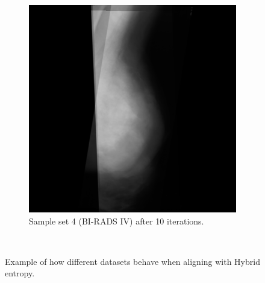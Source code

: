 \begin{figure}[H]
\begin{subfigure}[t]{0.4\textwidth}
        \includegraphics[width=\textwidth]{Appendix5/sample4/hybrid/hybrid_10.png}
        \caption{Sample set 4 (BI-RADS IV) after 10 iterations.}
        \label{fig:hybrid-set4-10iters}
    \end{subfigure}
    ~ %
      \caption{Example of how different datasets behave when aligning with Hybrid entropy.}
      \label{fig:hybrid-behaviour}
\end{figure}
